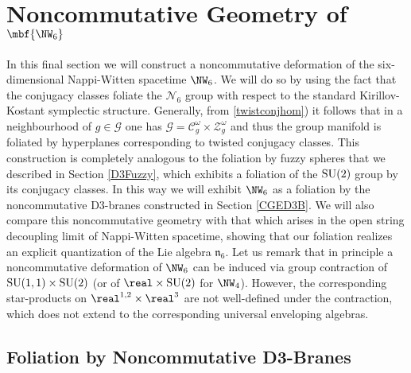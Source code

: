 \section{Noncommutative Geometry of $\mbf{\NW_6}$\label{TDNC}}

In this final section we will construct a noncommutative deformation
of the six-dimensional Nappi-Witten spacetime $\NW_6$. We will do so
by using the fact that the conjugacy classes foliate the
$\mathcal{N}_6$ group with respect to the standard Kirillov-Kostant
symplectic structure. Generally, from \eqref{twistconjhom}) it follows
that in a neighbourhood of $g\in\mathcal{G}$ one has
$\mathcal{G}=\mathcal{C}_g^\omega\times\mathcal{Z}_g^\omega$ and thus
the group manifold is foliated by hyperplanes corresponding to twisted
conjugacy classes. This construction is completely analogous to the
foliation by fuzzy spheres that we described in Section \ref{D3Fuzzy}, which
exhibits a foliation of the ${\rm SU}(2)$ group by its conjugacy
classes. In this way we will exhibit $\NW_6$ as a foliation by the
noncommutative D3-branes constructed in Section \ref{CGED3B}. We will
also compare this noncommutative geometry with that which arises in
the open string decoupling limit of Nappi-Witten spacetime, showing
that our foliation realizes an explicit quantization of the Lie
algebra $\mathfrak{n}_6$. Let us remark that in principle a
noncommutative deformation of $\NW_6$ can be induced via group
contraction of ${\rm SU}(1,1)\times{\rm SU}(2)$ (or of
$\real\times{\rm SU}(2)$ for $\NW_4$). However, the corresponding
star-products on $\real^{1,2}\times\real^3$ \cite{G-BLMV1,HLS-J1,HNT1}
are not well-defined under the contraction, which does not extend to
the corresponding universal enveloping algebras.

\subsection{Foliation by Noncommutative D3-Branes\label{D3Fol}}

